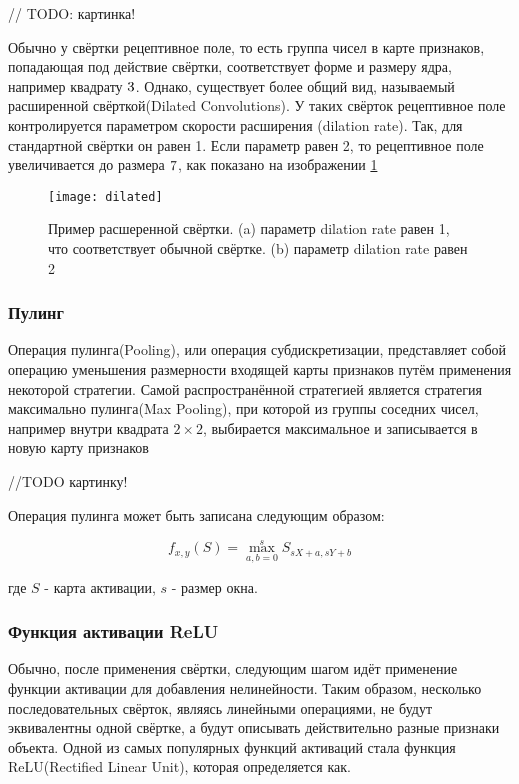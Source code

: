 // TODO: картинка!

Обычно у свёртки рецептивное поле, то есть группа чисел в карте признаков, попадающая под действие свёртки,
соответствует форме и размеру ядра, например квадрату $3 \time 3$. Однако, существует более общий вид,
называемый расширенной свёрткой(Dilated Convolutions)\cite{Dilated}. У таких свёрток рецептивное поле контролируется параметром скорости
расширения (dilation rate). Так, для стандартной свёртки он равен 1. Если параметр равен 2, то рецептивное поле увеличивается
до размера $7 \time 7$, как показано на изображении \ref{fig:dilated}

\begin{figure}[h]
    \centering
    \texttt{[image: dilated]}
    \caption{Пример расшеренной свёртки.     (a) параметр dilation rate равен 1, что соответствует обычной свёртке. (b) параметр dilation rate равен 2}
    \label{fig:dilated}
\end{figure}


\subsubsection{Пулинг}

Операция пулинга(Pooling), или операция субдискретизации, представляет собой операцию уменьшения размерности входящей карты признаков 
путём применения некоторой стратегии. Самой распространённой стратегией является стратегия максимально пулинга(Max Pooling),
при которой из группы соседних чисел, например внутри квадрата $2 \times 2$, выбирается максимальное и записывается в новую
карту признаков 

//TODO картинку!

Операция пулинга может быть записана следующим образом:

\begin{equation}
    f_{x,y}(S) = \max_{a,b=0}^{s}S_{sX+a, sY+b}
\end{equation}

где $S$ - карта активации, $s$ - размер окна.

\subsubsection{Функция активации ReLU}

Обычно, после применения свёртки, следующим шагом идёт применение функции активации для добавления нелинейности. Таким образом,
несколько последовательных свёрток, являясь линейными операциями, не будут эквивалентны одной свёртке, а будут описывать действительно 
разные признаки объекта. Одной из самых популярных функций активаций стала функция ReLU(Rectified Linear Unit), которая определяется
как.

